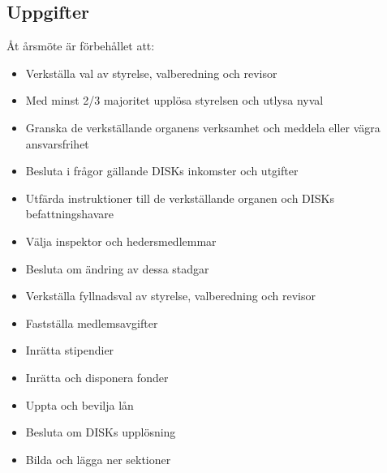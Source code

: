         \subsection{Uppgifter}
        \label{subsec:uppgifter}
                Åt årsmöte är förbehållet att:
                \begin{itemize}
                \setlength{\itemsep}{0.0cm}
                \setlength{\parskip}{0.0cm}
                        \item Verkställa val av styrelse, valberedning och revisor
                        \item Med minst 2/3 majoritet upplösa styrelsen och utlysa nyval
                        \item Granska de verkställande organens verksamhet och meddela eller vägra ansvarsfrihet
                        \item Besluta i frågor gällande DISKs inkomster och utgifter
                        \item Utfärda instruktioner till de verkställande organen och DISKs befattningshavare
                        \item Välja inspektor och hedersmedlemmar
                        \item Besluta om ändring av dessa stadgar
                        \item Verkställa fyllnadsval av styrelse, valberedning och revisor
                        \item Fastställa medlemsavgifter
                        \item Inrätta stipendier
                        \item Inrätta och disponera fonder
                        \item Uppta och bevilja lån
                        \item Besluta om DISKs upplösning
                        \item Bilda och lägga ner sektioner
                \end{itemize}

\clearpage
